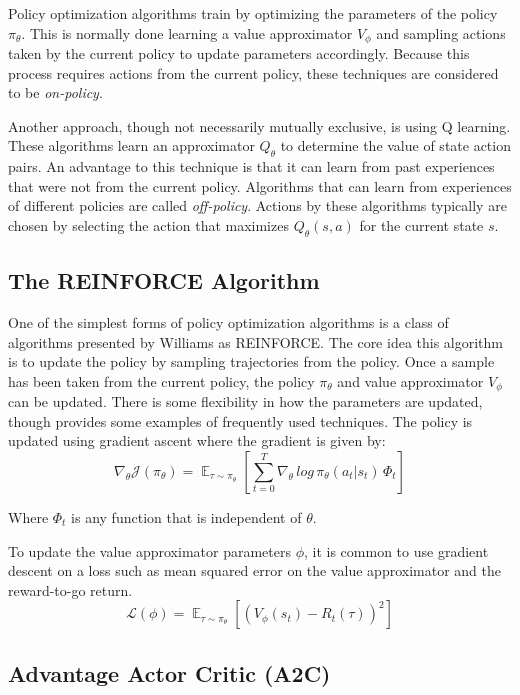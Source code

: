\documentclass[conference]{IEEEtran}
\begin{document}
Policy optimization algorithms train by optimizing the parameters of the policy $\pi_\theta$. This is normally done learning a value approximator $V_\phi$ and sampling actions taken by the current policy to update parameters accordingly. Because this process requires actions from the current policy, these techniques are considered to be \textit{on-policy}.

Another approach, though not necessarily mutually exclusive, is using Q learning. These algorithms learn an approximator $Q_\theta$ to determine the value of state action pairs. An advantage to this technique is that it can learn from past experiences that were not from the current policy. Algorithms that can learn from experiences of different policies are called \textit{off-policy}. Actions by these algorithms typically are chosen by selecting the action that maximizes $Q_\theta(s, a)$ for the current state $s$.

\subsection{The REINFORCE Algorithm}

One of the simplest forms of policy optimization algorithms is a class of algorithms presented by Williams as REINFORCE. \cite{REINFORCE} The core idea this algorithm is to update the policy by sampling trajectories from the policy. Once a sample has been taken from the current policy, the policy $\pi_\theta$ and value approximator $V_\phi$ can be updated. There is some flexibility in how the parameters are updated, though \cite{spinning_up_policy_optimization} provides some examples of frequently used techniques. The policy is updated using gradient ascent where the gradient is given by:
$$
    \nabla_\theta\mathcal{J(\pi_\theta)} = \mathop{\mathbb{E}}_{\tau \sim \pi_\theta} \left[\sum_{t=0}^{T}\nabla_\theta \, log \, \pi_\theta(a_t | s_t) \, \Phi_t \right]
$$
\begin{flushleft}
    Where $\Phi_t$ is any function that is independent of $\theta$.
\end{flushleft}


To update the value approximator parameters $\phi$, it is common to use gradient descent on a loss such as mean squared error on the value approximator and the reward-to-go return.
$$
    \mathcal{L}(\phi) = \mathop{\mathbb{E}}_{\tau \sim \pi_\theta} \left[\left(V_\phi(s_t) - R_t(\tau)\right)^2\right]
$$

\subsection{Advantage Actor Critic (A2C)}
\end{document}
